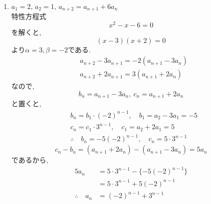 \begin{enumerate}[label=(\arabic*),parsep=3pt]
\[            \]
            である.両辺を$2^{n+1}$で割ると,
            \[
              \frac{a_{n+1}}{2^{n+1}}-\frac{a_n}{2^n}=\frac12
            \]
            ここで
            \[
              c_n=\dfrac{a_n}{2^n}
            \]
            と置くと,
            \begin{align*}
              &c_{n+1}=c_n+\frac12,\quad c_1=\frac{a_1}{2}=\frac12\\
              &\therefore \quad c_n=\frac12+(n-1)\cdot\frac12=\frac n2\\
              &\therefore \quad a_n=2^n\cdot c_n=n\cdot2^{n-1}
            \end{align*}
      \item $\displaystyle a_1=2,\,a_2=1,\, a_{n+2}=a_{n+1}+6a_n$\\
            特性方程式
            \[
              x^2-x-6=0
            \]
            を解くと,
            \[
              (x-3)(x+2)=0
            \]
            より$\alpha=3,\beta=-2$である.
            \begin{align*}
              &a_{n+2}-3a_{n+1}=-2(a_{n+1}-3a_n)\\
              &a_{n+2}+2a_{n+1}=3(a_{n+1}+2a_n)
            \end{align*}
            なので,
            \[
              b_n=a_{n+1}-3a_n,\ c_n=a_{n+1}+2a_n
            \]
            と置くと,
            \begin{align*}
              &b_n=b_1\cdot(-2)^{n-1},\quad b_1=a_2-3a_1=-5\\
              &c_n=c_1\cdot3^{n-1},\quad c_1=a_2+2a_1=5\\
              &\therefore \quad b_n=-5(-2)^{n-1},\quad c_n=5\cdot3^{n-1}
            \end{align*}
            \[
              c_n-b_n=(a_{n+1}+2a_n)-(a_{n+1}-3a_n)=5a_n
            \]
            であるから,
            \begin{align*}
              5a_n&=5\cdot3^{n-1}-\{-5(-2)^{n-1}\}\\
              &=5\cdot3^{n-1}+5(-2)^{n-1}\\
              \therefore\quad a_n&=(-2)^{n-1}+3^{n-1}
            \end{align*}
    \end{enumerate}

